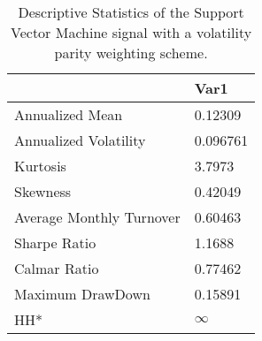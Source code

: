 \begin{table}[H]
\centering
\begin{tabular}{ll}
& Var1 \\ 
\hline 
Annualized Mean & 0.12309 \\ 
Annualized Volatility & 0.096761 \\ 
Kurtosis & 3.7973 \\ 
Skewness & 0.42049 \\ 
Average Monthly Turnover & 0.60463 \\ 
Sharpe Ratio & 1.1688 \\ 
Calmar Ratio & 0.77462 \\ 
Maximum DrawDown & 0.15891 \\ 
HH* & $\infty$ \\ 
\hline
\end{tabular}
\caption{Descriptive Statistics of the Support Vector Machine signal with a volatility parity weighting scheme.}
\label{SVM_MODEL}
\end{table}